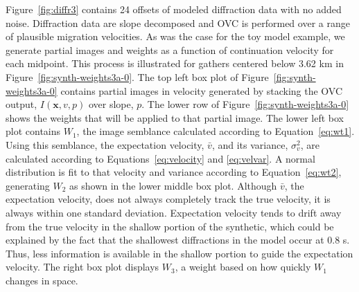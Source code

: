 
Figure~\ref{fig:diffr3} contains 24 offsets of modeled diffraction data with no added noise.  Diffraction data are slope decomposed and OVC is performed over a range of plausible migration velocities.  As was the case for the toy model example, we generate partial images and weights as a function of continuation velocity for each midpoint.  This process is illustrated for gathers centered below 3.62 km in Figure~\ref{fig:synth-weights3a-0}.  The top left box plot of Figure~\ref{fig:synth-weights3a-0} contains partial images in velocity generated by stacking the OVC output, $I(\mathbf{x},v,p)$ over slope, $p$.  The lower row of Figure~\ref{fig:synth-weights3a-0} shows the weights that will be applied to that partial image.  The lower left box plot contains $W_1$, the image semblance calculated according to Equation~\ref{eq:wt1}.  Using this semblance, the expectation velocity, $\bar{v}$, and its variance, $\sigma^2_v$, are calculated according to Equations~\ref{eq:velocity} and \ref{eq:velvar}. A normal distribution is fit to that velocity and variance according to Equation~\ref{eq:wt2}, generating $W_2$ as shown in the lower middle box plot.  
Although $\bar{v}$, the expectation velocity, does not always completely track the true velocity, it is always within one standard deviation.  Expectation velocity tends to drift away from the true velocity in the shallow portion of the synthetic, which could be explained by the fact that the shallowest diffractions in the model occur at 0.8 s.  Thus, less information is available in the shallow portion to guide the expectation velocity.  The right box plot displays $W_3$, a weight based on how quickly $W_1$ changes in space.  




